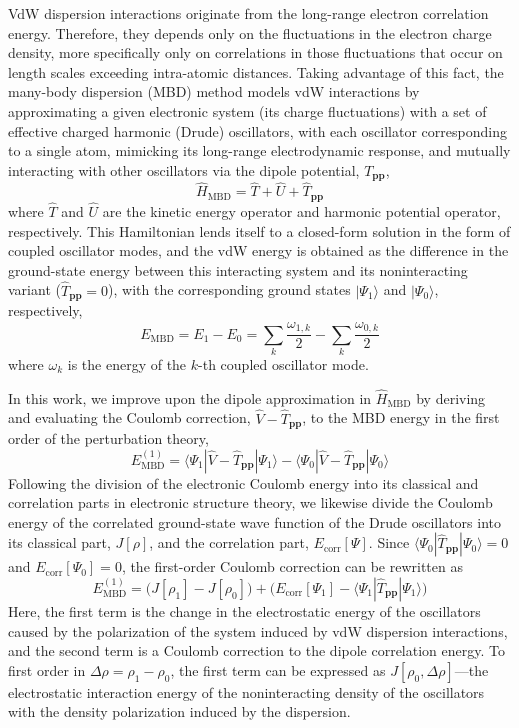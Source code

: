 \documentclass[aps,prl,groupaddress, twocolumn]{revtex4-1}  %
\begin{document}
VdW dispersion interactions originate from the long-range electron correlation energy.
Therefore, they depends only on the fluctuations in the electron charge density, more specifically only on correlations in those fluctuations that occur on length scales exceeding intra-atomic distances.
Taking advantage of this fact, the many-body dispersion (MBD) method models vdW interactions by approximating a given electronic system (its charge fluctuations) with a set of effective charged harmonic (Drude) oscillators, with each oscillator corresponding to a single atom, mimicking its long-range electrodynamic response, and mutually interacting with other oscillators via the dipole potential, $T_\mathbf{pp}$,
\begin{equation}
\hat H_\text{MBD}=\hat T+\hat U+\hat T_\mathbf{pp}
\end{equation}
where $\hat T$ and $\hat U$ are the kinetic energy operator and harmonic potential operator, respectively.
This Hamiltonian lends itself to a closed-form solution in the form of coupled oscillator modes, and the vdW energy is obtained as the difference in the ground-state energy between this interacting system and its noninteracting variant ($\hat T_\mathbf{pp}=0$), with the corresponding ground states $|\Psi_1\rangle$ and $|\Psi_0\rangle$, respectively,
\begin{equation}
E_\text{MBD}=E_1-E_0=\sum_k\frac{\omega_{1,k}}2-\sum_k\frac{\omega_{0,k}}2
\end{equation}
where $\omega_k$ is the energy of the $k$-th coupled oscillator mode.

In this work, we improve upon the dipole approximation in $\hat H_\text{MBD}$ by deriving and evaluating the Coulomb correction, $\hat V-\hat T_\mathbf{pp}$, to the MBD energy in the first order of the perturbation theory,
\begin{equation}
E_\text{MBD}^{(1)}=\langle\Psi_1|\hat V-\hat T_\mathbf{pp}|\Psi_1\rangle-\langle\Psi_0|\hat V-\hat T_\mathbf{pp}|\Psi_0\rangle
\end{equation}
Following the division of the electronic Coulomb energy into its classical and correlation parts in electronic structure theory, we likewise divide the Coulomb energy of the correlated ground-state wave function of the Drude oscillators into its classical part, $J[\rho]$, and the correlation part, $E_\text{corr}[\Psi]$.
Since $\langle\Psi_0|\hat T_\mathbf{pp}|\Psi_0\rangle=0$ and $E_\text{corr}[\Psi_0]=0$, the first-order Coulomb correction can be rewritten as
\begin{equation}
E_\text{MBD}^{(1)}=\bigl(J[\rho_1]-J[\rho_0]\bigr)+\bigl(E_\text{corr}[\Psi_1]-\langle\Psi_1|\hat T_\mathbf{pp}|\Psi_1\rangle\bigr)
\end{equation}
Here, the first term is the change in the electrostatic energy of the oscillators caused by the polarization of the system induced by vdW dispersion interactions, and the second term is a Coulomb correction to the dipole correlation energy.
To first order in $\Delta\rho=\rho_1-\rho_0$, the first term can be expressed as $J[\rho_0,\Delta\rho]$---the electrostatic interaction energy of the noninteracting density of the oscillators with the density polarization induced by the dispersion.
\end{document}
